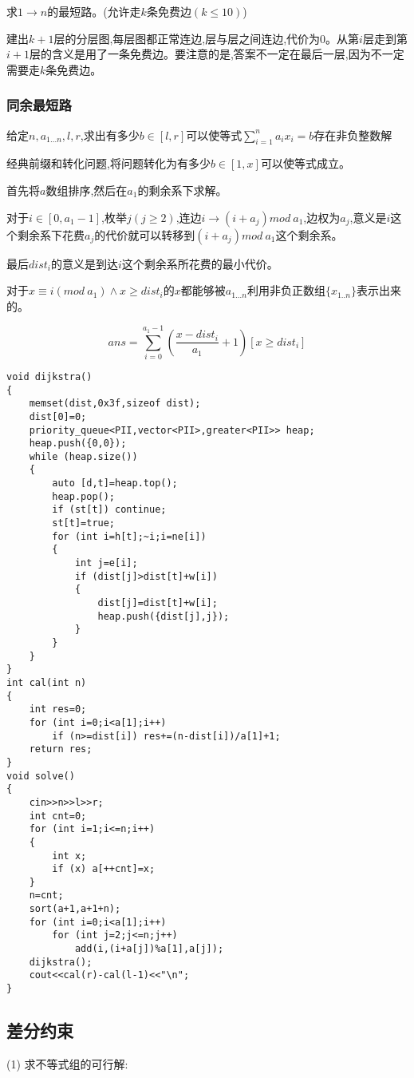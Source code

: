 \documentclass[a4paper]{ctexart}
\begin{document}
求$1\rightarrow n$的最短路。(允许走$k$条免费边$(k\le 10)$)

建出$k+1$层的分层图,每层图都正常连边,层与层之间连边,代价为0。从第$i$层走到第$i+1$层的含义是用了一条免费边。要注意的是,答案不一定在最后一层,因为不一定需要走$k$条免费边。

\subsubsection{同余最短路}

给定$n,a_{1...n},l,r$,求出有多少$b\in [l,r]$可以使等式$\sum\limits_{i=1}^n{a_ix_i}=b$存在非负整数解

经典前缀和转化问题,将问题转化为有多少$b\in [1,x]$可以使等式成立。

首先将$a$数组排序,然后在$a_1$的剩余系下求解。

对于$i\in [0,a_1-1]$,枚举$j(j\ge 2)$,连边$i\rightarrow (i+a_j)mod\ a_1$,边权为$a_j$,意义是$i$这个剩余系下花费$a_j$的代价就可以转移到$(i+a_j)mod\ a_1$这个剩余系。

最后$dist_i$的意义是到达$i$这个剩余系所花费的最小代价。

对于$x\equiv i(mod\ a_1)\wedge x\ge dist_i$的$x$都能够被$a_{1...n}$利用非负正数组$\{x_{1..n}\}$表示出来的。

$$ans=\sum\limits_{i=0}^{a_1-1}{(\frac{x-dist_i}{a_1}+1)[x\ge dist_i]}$$


\begin{lstlisting}
void dijkstra()
{
    memset(dist,0x3f,sizeof dist);
    dist[0]=0;
    priority_queue<PII,vector<PII>,greater<PII>> heap;
    heap.push({0,0});
    while (heap.size())
    {
        auto [d,t]=heap.top();
        heap.pop();
        if (st[t]) continue;
        st[t]=true;
        for (int i=h[t];~i;i=ne[i])
        {
            int j=e[i];
            if (dist[j]>dist[t]+w[i])
            {
                dist[j]=dist[t]+w[i];
                heap.push({dist[j],j});
            }
        }
    }
}
int cal(int n)
{
    int res=0;
    for (int i=0;i<a[1];i++)
        if (n>=dist[i]) res+=(n-dist[i])/a[1]+1;
    return res;
}
void solve()
{
    cin>>n>>l>>r;
    int cnt=0;
    for (int i=1;i<=n;i++)
    {
        int x;
        if (x) a[++cnt]=x;
    }
    n=cnt;
    sort(a+1,a+1+n);
    for (int i=0;i<a[1];i++)
        for (int j=2;j<=n;j++)
            add(i,(i+a[j])%a[1],a[j]);
    dijkstra();
    cout<<cal(r)-cal(l-1)<<"\n";
}
\end{lstlisting}

\subsection{差分约束}
(1) 求不等式组的可行解:
\end{document}
